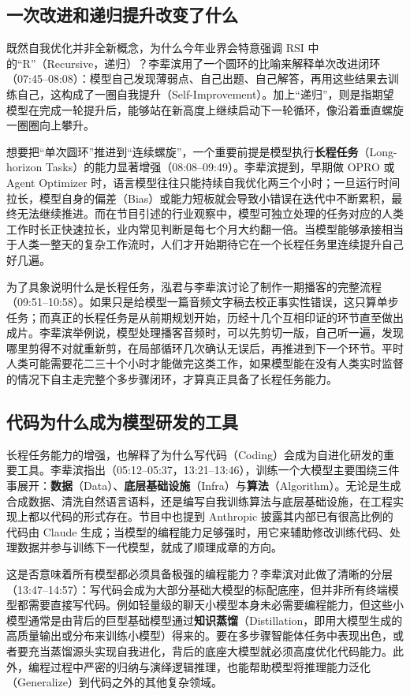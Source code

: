 \documentclass[UTF8,a4paper,11pt,fontset=fandol]{ctexart}
\begin{document}
\subsection{一次改进和递归提升改变了什么}
既然自我优化并非全新概念，为什么今年业界会特意强调 RSI 中的“R”（Recursive，递归）？李辈滨用了一个圆环的比喻来解释单次改进闭环（07:45–08:08）：模型自己发现薄弱点、自己出题、自己解答，再用这些结果去训练自己，这构成了一圈自我提升（Self-Improvement）。加上“递归”，则是指期望模型在完成一轮提升后，能够站在新高度上继续启动下一轮循环，像沿着垂直螺旋一圈圈向上攀升。

想要把“单次圆环”推进到“连续螺旋”，一个重要前提是模型执行\textbf{长程任务}（Long-horizon Tasks）的能力显著增强（08:08–09:49）。李辈滨提到，早期做 OPRO 或 Agent Optimizer 时，语言模型往往只能持续自我优化两三个小时；一旦运行时间拉长，模型自身的偏差（Bias）或能力短板就会导致小错误在迭代中不断累积，最终无法继续推进。而在节目引述的行业观察中，模型可独立处理的任务对应的人类工作时长正快速拉长，业内常见判断是每七个月大约翻一倍。当模型能够承接相当于人类一整天的复杂工作流时，人们才开始期待它在一个长程任务里连续提升自己好几遍。

为了具象说明什么是长程任务，泓君与李辈滨讨论了制作一期播客的完整流程（09:51–10:58）。如果只是给模型一篇音频文字稿去校正事实性错误，这只算单步任务；而真正的长程任务是从前期规划开始，历经十几个互相印证的环节直至做出成片。李辈滨举例说，模型处理播客音频时，可以先剪切一版，自己听一遍，发现哪里剪得不对就重新剪，在局部循环几次确认无误后，再推进到下一个环节。平时人类可能需要花二三十个小时才能做完这类工作，如果模型能在没有人类实时监督的情况下自主走完整个多步骤闭环，才算真正具备了长程任务能力。

\subsection{代码为什么成为模型研发的工具}
长程任务能力的增强，也解释了为什么写代码（Coding）会成为自进化研发的重要工具。李辈滨指出（05:12–05:37，13:21–13:46），训练一个大模型主要围绕三件事展开：\textbf{数据}（Data）、\textbf{底层基础设施}（Infra）与\textbf{算法}（Algorithm）。无论是生成合成数据、清洗自然语言语料，还是编写自我训练算法与底层基础设施，在工程实现上都以代码的形式存在。节目中也提到 Anthropic 披露其内部已有很高比例的代码由 Claude 生成；当模型的编程能力足够强时，用它来辅助修改训练代码、处理数据并参与训练下一代模型，就成了顺理成章的方向。

这是否意味着所有模型都必须具备极强的编程能力？李辈滨对此做了清晰的分层（13:47–14:57）：写代码会成为大部分基础大模型的标配底座，但并非所有终端模型都需要直接写代码。例如轻量级的聊天小模型本身未必需要编程能力，但这些小模型通常是由背后的巨型基础模型通过\textbf{知识蒸馏}（Distillation，即用大模型生成的高质量输出或分布来训练小模型）得来的。要在多步骤智能体任务中表现出色，或者要充当蒸馏源头实现自我进化，背后的底座大模型就必须高度优化代码能力。此外，编程过程中严密的归纳与演绎逻辑推理，也能帮助模型将推理能力泛化（Generalize）到代码之外的其他复杂领域。
\end{document}
